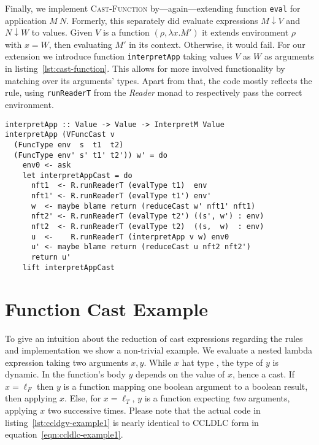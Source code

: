 Finally, we implement \textsc{Cast-Function} by---again---extending function \texttt{eval} for application $M~N$. Formerly, this separately did evaluate expressions $M \downarrow V$ and $N \downarrow W$ to values. Given $V$ is a function $(\rho, \lambda x. M')$ it extends environment $\rho$ with $x=W$, then evaluating $M'$ in its context. Otherwise, it would fail. For our extension we introduce function \texttt{interpretApp} taking values $V$ as $W$ as arguments in listing~\ref{lst:cast-function}. This allows for more involved functionality by matching over its arguments' types. Apart from that, the code mostly reflects the rule, using \texttt{runReaderT} from the \emph{Reader} monad to respectively pass the correct environment.

\begin{lstlisting}[float,
  caption=Rule \textsc{Cast-Function} (\texttt{Interpreter.hs}),
  label=lst:cast-function]
interpretApp :: Value -> Value -> InterpretM Value
interpretApp (VFuncCast v
  (FuncType env  s  t1  t2)
  (FuncType env' s' t1' t2')) w' = do
    env0 <- ask
    let interpretAppCast = do
      nft1  <- R.runReaderT (evalType t1)  env
      nft1' <- R.runReaderT (evalType t1') env'
      w  <- maybe blame return (reduceCast w' nft1' nft1)
      nft2' <- R.runReaderT (evalType t2') ((s', w') : env)
      nft2  <- R.runReaderT (evalType t2)  ((s,  w)  : env)
      u  <-    R.runReaderT (interpretApp v w) env0
      u' <- maybe blame return (reduceCast u nft2 nft2')
      return u'
    lift interpretAppCast
\end{lstlisting}

\section{Function Cast Example}

To give an intuition about the reduction of cast expressions regarding the rules and implementation we show a non-trivial example. We evaluate a nested lambda expression taking two arguments $x,y$. While $x$ hat type \Bool, the type of $y$ is dynamic. In the function's body $y$ depends on the value of $x$, hence a cast. If $x=\ell_F$ then $y$ is a function mapping one boolean argument to a boolean result, then applying $x$. Else, for $x=\ell_T$, $y$ is a function expecting \emph{two} arguments, applying $x$ two successive times. Please note that the actual code in listing~\ref{lst:ccldgv-example1} is nearly identical to CCLDLC form in equation~\ref{eqn:ccldlc-example1}.

